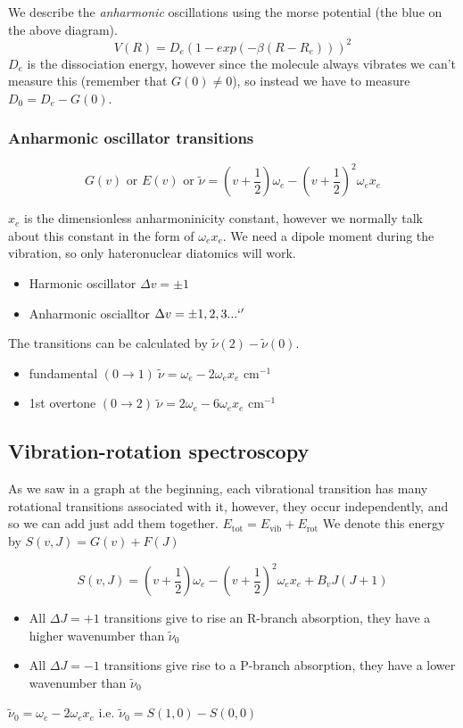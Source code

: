 \documentclass{article}
\newcommand{\mcm}{\text{ cm}^{-1}}
\begin{document}
    We describe the \emph{anharmonic} oscillations using the morse potential (the blue on the above diagram).
    $$V(R) = D_e\left(1 - exp(-\beta(R-R_e))\right)^2$$
    $D_e$ is the dissociation energy, however since the molecule always vibrates we can't measure this (remember
    that $G(0) \neq 0$), so instead we have to measure $D_0 = D_e - G(0)$.

    \subsubsection{Anharmonic oscillator transitions}
    $$G(v) \text{ or } E(v) \text{ or } \tilde{\nu} = (v + \frac{1}{2})\omega_e - (v+\frac{1}{2})^2\omega_e x_e$$
    
    $x_e$ is the dimensionless anharmoninicity constant, however we normally talk about this constant in the form 
    of $\omega_e x_e$. We need a dipole moment during the vibration, so only hateronuclear diatomics will work. 
    \begin{itemize}
        \item Harmonic oscillator $\Delta v = \pm 1$
        \item Anharmonic oscialltor  $\Delta v = \pm 1, 2, 3...`'$
    \end{itemize}
    The transitions can be calculated by $\tilde{\nu}(2) - \tilde{\nu}(0)$.
    \begin{itemize}
        \item fundamental $(0 \rightarrow 1)\ \tilde{\nu}  = \omega_e - 2\omega_e x_e \mcm$
        \item 1st overtone $(0 \rightarrow 2)\ \tilde{\nu} = 2\omega_e - 6\omega_e x_e \mcm$
    \end{itemize}

    \subsection{Vibration-rotation spectroscopy}

    As we saw in a graph at the beginning, each vibrational transition has many rotational transitions associated
    with it, however, they occur independently, and so we can add just add them together. $E_\text{tot} = E_\text{vib} + E_\text{rot}$
    We denote this energy by $S(v, J) = G(v) + F(J)$ 

    $$S(v, J) = \left(v + \frac{1}{2}\right)\omega_e - \left(v + \frac{1}{2}\right)^2\omega_e x_e + B_vJ(J+1)$$

    \begin{itemize}
        \item All $\Delta J = +1$ transitions give to rise an R-branch absorption, they have a higher wavenumber than $\tilde{\nu}_0$
        \item All $\Delta J = -1$ transitions give rise to a P-branch absorption, they have a lower wavenumber than $\tilde{\nu}_0$
    \end{itemize}
    $\tilde{\nu}_0 = \omega_e - 2\omega_e x_e$ i.e. $\tilde{\nu}_0 = S(1, 0) - S(0, 0)$
    
\end{document}
